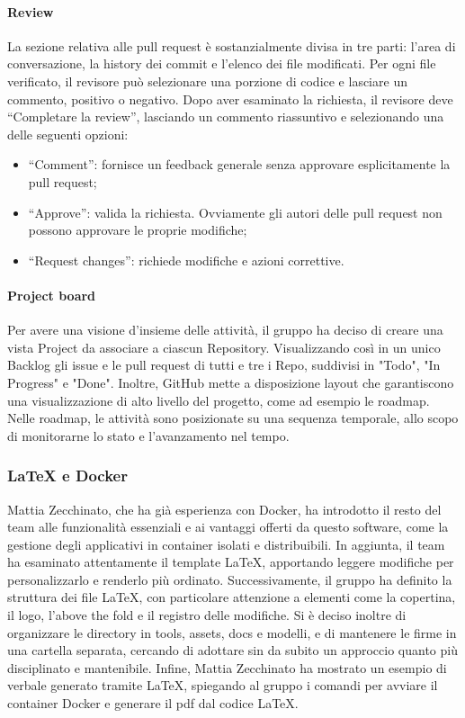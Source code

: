 \paragraph{Review}
La sezione relativa alle pull request è sostanzialmente divisa in tre parti: l'area di conversazione, la history dei commit e l'elenco dei file modificati. Per ogni file verificato, il revisore può selezionare una porzione di codice e lasciare un commento, positivo o negativo. Dopo aver esaminato la richiesta, il revisore deve “Completare la review”, lasciando un commento riassuntivo e selezionando una delle seguenti opzioni:
\begin{itemize}
	\item “Comment”: fornisce un feedback generale senza approvare esplicitamente la pull request;
	\item “Approve”: valida la richiesta. Ovviamente gli autori delle pull request non possono approvare le proprie modifiche;
	\item “Request changes”: richiede modifiche e azioni correttive.
\end{itemize}

\paragraph{Project board}
Per avere una visione d'insieme delle attività, il gruppo ha deciso di creare una vista Project da associare a ciascun Repository. Visualizzando così in un unico Backlog gli issue e le pull request di tutti e tre i Repo, suddivisi in "Todo", "In Progress" e "Done".  Inoltre, GitHub mette a disposizione layout che garantiscono una visualizzazione di alto livello del progetto, come ad esempio le roadmap. Nelle roadmap, le attività sono posizionate su una sequenza temporale, allo scopo di monitorarne lo stato e l’avanzamento nel tempo.

\subsubsection{LaTeX e Docker}
Mattia Zecchinato, che ha già esperienza con Docker, ha introdotto il resto del team alle funzionalità essenziali e ai vantaggi offerti da questo software, come la gestione degli applicativi in container isolati e distribuibili. In aggiunta, il team ha esaminato attentamente il template LaTeX, apportando leggere modifiche per personalizzarlo e renderlo più ordinato. Successivamente, il gruppo ha definito la struttura dei file LaTeX, con particolare attenzione a elementi come la copertina, il logo, l’above the fold e il registro delle modifiche. Si è deciso inoltre di organizzare le directory in tools, assets, docs e modelli, e di mantenere le firme in una cartella separata, cercando di adottare sin da subito un approccio quanto più disciplinato e mantenibile. Infine, Mattia Zecchinato ha mostrato un esempio di verbale generato tramite LaTeX, spiegando al gruppo i comandi per avviare il container Docker e generare il pdf dal codice LaTeX.

\clearpage
